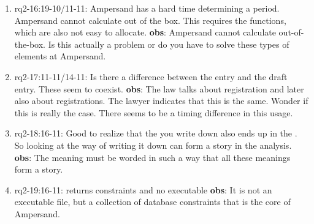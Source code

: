 \begin{enumerate}
    \item rq2-16:19-10/11-11: Ampersand has a hard time determining a period.
    Ampersand cannot calculate out of the box.
    This requires the  functions, which are also not easy to allocate.
    \newline\textbf{obs}: Ampersand cannot calculate out-of-the-box.
    Is this actually a problem or do you have to solve these types of elements at Ampersand.
    
    \item rq2-17:11-11/14-11: Is there a difference between the  entry and the draft entry.
    These seem to coexist.
    \newline\textbf{obs}: The law talks about registration and later also about registrations.
    The lawyer indicates that this is the same.
    Wonder if this is really the case.
    There seems to be a timing difference in this usage.
    
    \item rq2-18:16-11: Good to realize that the  you write down also ends up in the .
    So looking at the way of writing it down can form a story in the analysis.
    \newline\textbf{obs}: The meaning must be worded in such a way that all these meanings form a story.
    
    \item rq2-19:16-11:  returns constraints and no executable
    \newline\textbf{obs}: It is not an executable file, but a collection of database constraints that is the core of Ampersand.
    
\end{enumerate}


\newpage
